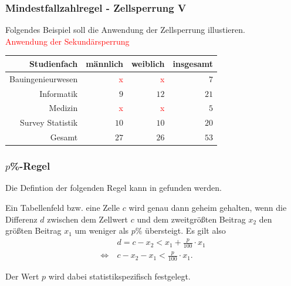 \documentclass[aspectratio=169]{beamer}
\begin{document}
\begin{frame}
    \frametitle{Mindestfallzahlregel - Zellsperrung V}
    Folgendes Beispiel soll die Anwendung der Zellsperrung illustieren. \\
    \textcolor{red}{Anwendung der Sekundärsperrung}
    \begin{center}
        \begin{tabular}{ r r r r }
         \textbf{Studienfach} \vline & \textbf{männlich} & \textbf{weiblich} & \textbf{insgesamt} \\ 
         \hline
         Bauingenieurwesen \vline & \textcolor{red}{x} & \textcolor{red}{x} & $7$ \\
         Informatik \vline & $9$ & $12$ & $21$ \\  
         Medizin \vline & \textcolor{red}{x} & \textcolor{red}{x} & $5$ \\
         Survey Statistik \vline & $10$ & $10$ & $20$ \\
         \hline
         Gesamt \vline & $27$ & $26$ & $53$
        \end{tabular}
    \end{center}
\end{frame}


\begin{frame}
    \frametitle{$p$\%-Regel}
    Die Defintion der folgenden Regel kann in \cite{Rothe-2} gefunden werden.
    \begin{theorem}[$p$\%-Regel]
        Ein Tabellenfeld bzw. eine Zelle $c$ wird genau dann geheim gehalten, wenn die Differenz $d$ zwischen dem Zellwert $c$ und dem zweitgrößten Beitrag $x_2$ den größten Beitrag $x_1$ um weniger als $p$\% übersteigt. Es gilt also 
        \begin{align}
            & d = c - x_2 < x_1 + \frac{p}{100} \cdot x_1 \\
            \Leftrightarrow \: & c - x_2 - x_ 1 <  \frac{p}{100} \cdot x_1.
        \end{align}
    \end{theorem}
    Der Wert $p$ wird dabei statistikspezifisch festgelegt.
\end{frame}
\end{document}
